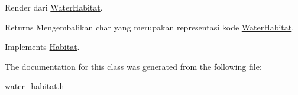 Render dari \hyperlink{classWaterHabitat}{Water\+Habitat}. 

\begin{DoxyReturn}{Returns}
Mengembalikan char yang merupakan representasi kode \hyperlink{classWaterHabitat}{Water\+Habitat}. 
\end{DoxyReturn}


Implements \hyperlink{classHabitat_ad1bf10205d38e8e308eb9acc3aa2872c}{Habitat}.



The documentation for this class was generated from the following file\+:\begin{DoxyCompactItemize}
\item 
\hyperlink{water__habitat_8h}{water\+\_\+habitat.\+h}\end{DoxyCompactItemize}
